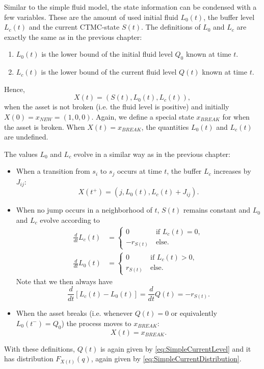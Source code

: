 Similar to the simple fluid model, the state information can be condensed with a few variables.
These are the amount of used initial fluid $L_0(t)$, the buffer level $L_c(t)$ and the current CTMC-state $S(t)$.
The definitions of $L_0$ and $L_c$ are exactly the same as in the previous chapter:
\begin{enumerate}
	\item $L_0(t)$ is the lower bound of the initial fluid level $Q_0$ known at time $t$.
	\item $L_c(t)$ is the lower bound of the current fluid level $Q(t)$ known at time $t$.
\end{enumerate}
Hence,
\[
X(t)=(S(t),L_0(t),L_c(t)),
\]
when the asset is not broken (i.e. the fluid level is positive) and initially $X(0)=x_{NEW}=(1,0,0)$.
Again, we define a special state $x_{BREAK}$ for when the asset is broken.
When $X(t)=x_{BREAK}$, the quantities $L_0(t)$ and $L_c(t)$ are undefined.

The values $L_0$ and $L_c$ evolve in a similar way as in the previous chapter:
\begin{itemize}
	\item When a transition from $s_i$ to $s_j$ occurs at time $t$, the buffer $L_c$ increases by $J_{ij}$:
	\begin{equation}\label{eq:MmfmJumpEvolution}
	X(t^+)=(j,L_0(t),L_c(t)+J_{ij}).
	\end{equation}
	\item When no jump occurs in a neighborhood of $t$, $S(t)$ remains constant and $L_0$ and $L_c$ evolve according to
	\begin{equation}\label{eq:MmfmAgeEvolution}
	\begin{split}
	\frac{d}{dt}L_c(t)&=\begin{cases}
	0&\ \text{if }L_c(t)=0,\\
	-r_{S(t)}&\ \text{else.}
	\end{cases}\\
	\frac{d}{dt}L_0(t)&=\begin{cases}
	0&\ \text{if }L_c(t)>0,\\
	r_{S(t)}&\ \text{else.}
	\end{cases}
	\end{split}
	\end{equation}
	Note that we then always have
	\[
	\frac{d}{dt}\left[L_c(t)-L_0(t)\right]=\frac{d}{dt}Q(t)=-r_{S(t)}.
	\]
	\item When the asset breaks (i.e. whenever $Q(t)=0$ or equivalently $L_0(t^-)=Q_0$) the process moves to $x_{BREAK}$:
	\[
	X(t)=x_{BREAK}.
	\]
\end{itemize}
With these definitions, $Q(t)$ is again given by \eqref{eq:SimpleCurrentLevel} and it has distribution $F_{X(t)}(q)$,  again given by \eqref{eq:SimpleCurrentDistribution}.

